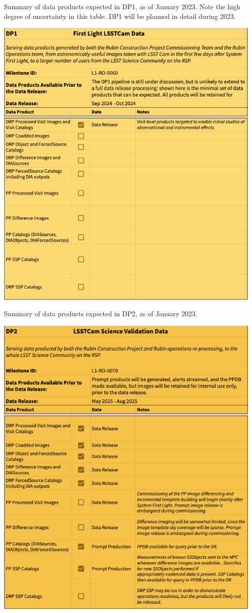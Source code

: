 \begin{table}[ht]
\centering
\label{tab:dp-one-products}
\caption{Summary of data products expected in DP1, as of January 2023.
Note the high degree of uncertainty in this table. DP1 will be planned in detail during 2023.}
\includegraphics[width=0.9\linewidth]{figures/DP1-products}
\end{table}

\begin{table}[ht]
\centering
\label{tab:dp-two-products}
\caption{Summary of data products expected in DP2, as of January 2023.}
\includegraphics[width=0.9\linewidth]{figures/DP2-products}
\end{table}

